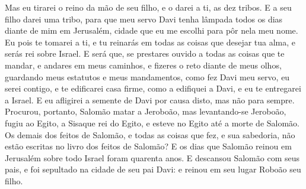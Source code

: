 {{{{  Mas eu tirarei o reino da mão de seu filho, e o darei a ti, as dez tribos.
  E a seu filho darei uma tribo, para que meu servo Davi tenha lâmpada todos os dias diante de mim em Jerusalém, cidade que eu me escolhi para pôr nela meu nome.
  Eu pois te tomarei a ti, e tu reinarás em todas as coisas que desejar tua alma, e serás rei sobre Israel.
  E será que, se prestares ouvido a todas as coisas que te mandar, e andares em meus caminhos, e fizeres o reto diante de meus olhos, guardando meus estatutos e meus mandamentos, como fez Davi meu servo, eu serei contigo, e te edificarei casa firme, como a edifiquei a Davi, e eu te entregarei a Israel.
  E eu afligirei a semente de Davi por causa disto, mas não para sempre}}}.
  Procurou, portanto, Salomão matar a Jeroboão, mas levantando-se Jeroboão, fugiu ao Egito, a Sisaque rei do Egito, e esteve no Egito até a morte de Salomão. %
  Os demais dos feitos de Salomão, e todas as coisas que fez, e sua sabedoria, não estão escritas no livro dos feitos de Salomão?
  E os dias que Salomão reinou em Jerusalém sobre todo Israel foram quarenta anos.
  E descansou Salomão com seus pais, e foi sepultado na cidade de seu pai Davi: e reinou em seu lugar Roboão seu filho.
\par }


